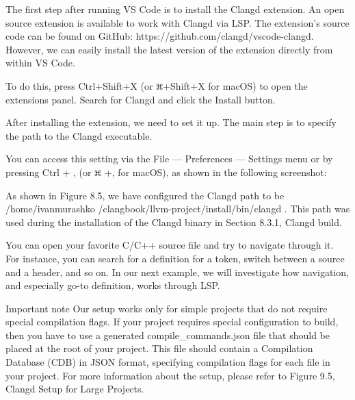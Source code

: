 The first step after running VS Code is to install the Clangd extension. An open source extension is available to work with Clangd via LSP. The extension's source code can be found on GitHub: https://github.com/clangd/vscode-clangd. However, we can easily install the latest version of the extension directly from within VS Code.

To do this, press Ctrl+Shift+X (or \includegraphics[width=0.02\textwidth]{content/part2/chapter8/images/3.png}+Shift+X for macOS) to open the extensions panel. Search for Clangd and click the Install button.


After installing the extension, we need to set it up. The main step is to specify the path to the Clangd executable.

You can access this setting via the File — Preferences — Settings menu or by pressing Ctrl + , (or \includegraphics[width=0.02\textwidth]{content/part2/chapter8/images/3.png} +, for macOS), as shown in the following screenshot:


As shown in Figure 8.5, we have configured the Clangd path to be /home/ivanmurashko /clangbook/llvm-project/install/bin/clangd . This path was used during the installation of the Clangd binary in Section 8.3.1, Clangd build.

You can open your favorite C/C++ source file and try to navigate through it. For instance, you can search for a definition for a token, switch between a source and a header, and so on. In our next example, we will investigate how navigation, and especially go-to definition, works through LSP.

\begin{myNotic}{Important note}
Our setup works only for simple projects that do not require special compilation flags. If your project requires special configuration to build, then you have to use a generated compile\_commands.json file that should be placed at the root of your project. This file should contain a Compilation Database (CDB) in JSON format, specifying compilation flags for each file in your project. For more information about the setup, please refer to Figure 9.5, Clangd Setup for Large Projects.
\end{myNotic}

